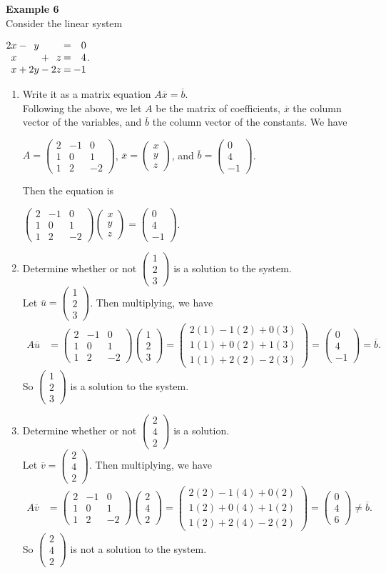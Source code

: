 \documentclass[12pt]{article}
\makeatletter
\def\it{\item}
\def\be{\begin{enumerate}} \def\ee{\end{enumerate}}
\def\bc{\begin{center}} \def\ec{\end{center}}
\def\lp{\left(} \def\rp{\right)} \def\abs#1{\vert #1 \vert}
\def\bar#1{\overline{#1}}
\def\colth#1#2#3{\lp \begin{array}{rrr} #1 \\ #2 \\ #3 \end{array} \rp}
\newenvironment{linsys}[2][m]{%
\setlength{\arraycolsep}{.1111em} %
\begin{array}[#1]{@{}*{#2}{rc}r@{}} 
}{%
\end{array}}
\makeatother
\begin{document}
{\bf Example 6} \\
Consider the linear system
\bc
$\begin{linsys}{3}
2x &- &y  &\ &\  &= &0 \\
 x &  &\  &+ &z  &= &4 \\
 x &+ &2y &- &2z &= &-1
\end{linsys}$.
\ec

\be
\it Write it as a matrix equation $A\bar{x} = \bar{b}$. \\
Following the above, we let $A$ be the matrix of coefficients, $\bar{x}$ the column vector of the variables, and $\bar{b}$ the column vector of the constants. We have
\bc
$A = \lp \begin{array}{rrr} 2 & -1 & 0 \\ 1 & 0 & 1 \\ 1 & 2 & -2 \end{array} \rp$, $\bar{x} = \colth{x}{y}{z}$, and
$\bar{b} = \lp \begin{array}{r} 0 \\ 4 \\ -1 \end{array} \rp$.
\ec
Then the equation is 
\bc
$\lp \begin{array}{rrr} 2 & -1 & 0 \\ 1 & 0 & 1 \\ 1 & 2 & -2 \end{array} \rp \colth{x}{y}{z} = \lp \begin{array}{r} 0 \\ 4 \\ -1 \end{array} \rp$.
\ec
\it Determine whether or not $\colth{1}{2}{3}$ is a solution to the system. \\
Let $\bar{u} = \colth{1}{2}{3}$. Then multiplying, we have 
\begin{align*}
A\bar{u} &= 
\lp \begin{array}{rrr} 2 & -1 & 0 \\ 1 & 0 & 1 \\ 1 & 2 & -2 \end{array} \rp \colth{1}{2}{3} = \colth{2(1)-1(2)+0(3)}{1(1)+0(2)+1(3)}{1(1)+2(2)-2(3)} = \lp \begin{array}{r} 0 \\ 4 \\ -1 \end{array} \rp = \bar{b}.
\end{align*}
So $\colth{1}{2}{3}$ is a solution to the system. 
\it Determine whether or not $\colth{2}{4}{2}$ is a solution. \\
Let $\bar{v} = \colth{2}{4}{2}$. Then multiplying, we have 
\begin{align*}
A\bar{v} &= \lp \begin{array}{rrr} 2 & -1 & 0 \\ 1 & 0 & 1 \\ 1 & 2 & -2 \end{array} \rp \colth{2}{4}{2} = \colth{2(2)-1(4)+0(2)}{1(2)+0(4)+1(2)}{1(2)+2(4)-2(2)} = \colth{0}{4}{6}
\not= \bar{b}.
\end{align*}
So $\colth{2}{4}{2}$ is not a solution to the system.
\ee
\end{document}
